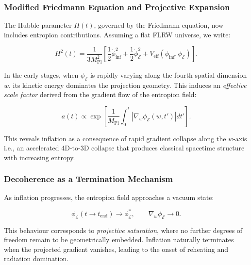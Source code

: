 \documentclass[12pt]{article}
\begin{document}
\subsubsection*{Modified Friedmann Equation and Projective Expansion}

The Hubble parameter \(H(t)\), governed by the Friedmann equation, now includes entropion contributions. Assuming a flat FLRW universe, we write:

\begin{equation}
\label{eq:friedmann_modified}
H^2(t) = \frac{1}{3 M_{\text{Pl}}^2} \left[ \frac{1}{2} \dot{\phi}_{\text{inf}}^2 + \frac{1}{2} \dot{\phi}_{\mathcal{E}}^2 + V_{\text{eff}}(\phi_{\text{inf}}, \phi_{\mathcal{E}}) \right].
\end{equation}

In the early stages, when \(\phi_{\mathcal{E}}\) is rapidly varying along the fourth spatial dimension \(w\), its kinetic energy dominates the projection geometry. This induces an \emph{effective scale factor} derived from the gradient flow of the entropion field:

\begin{equation}
\label{eq:scale_factor_projection}
a(t) \propto \exp \left[ \frac{1}{M_{\text{Pl}}} \int_0^t \left| \nabla_w \phi_{\mathcal{E}}(w,t') \right| dt' \right].
\end{equation}

This reveals inflation as a consequence of rapid gradient collapse along the \(w\)-axis i.e., an accelerated 4D-to-3D collapse that produces classical spacetime structure with increasing entropy.

\subsubsection*{Decoherence as a Termination Mechanism}

As inflation progresses, the entropion field approaches a vacuum state:

\begin{equation}
\label{eq:entropion_vacuum}
\phi_{\mathcal{E}}(t \rightarrow t_{\text{end}}) \rightarrow \phi_{\mathcal{E}}^\ast, \qquad \nabla_w \phi_{\mathcal{E}} \rightarrow 0.
\end{equation}

This behaviour corresponds to \emph{projective saturation}, where no further degrees of freedom remain to be geometrically embedded. Inflation naturally terminates when the projected gradient vanishes, leading to the onset of reheating and radiation domination.
\end{document}
